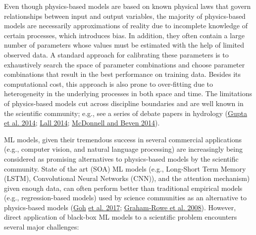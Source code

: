 \documentclass[book.tex]{subfiles}
\begin{document}
Even though physics-based models are based on known physical laws that
govern relationships between input and output variables, the majority of
physics-based models are necessarily approximations of reality due to
incomplete knowledge of certain processes, which introduces bias. In
addition, they often contain a large number of parameters whose values
must be estimated with the help of limited observed data. A standard
approach for calibrating these parameters is to exhaustively search the
space of parameter combinations and choose parameter combinations that
result in the best performance on training data. Besides its
computational cost, this approach is also prone to over-fitting due
to heterogeneity in the underlying processes in both space and time. The
limitations of physics-based models cut across discipline boundaries and
are well known in the scientific community; e.g., see a series of
debate papers in hydrology (\protect\hyperlink{page23}{Gupta et al.
2014}; \protect\hyperlink{page23}{Lall 2014};
\protect\hyperlink{page23}{McDonnell and Beven 2014}).

ML models, given their tremendous success in several commercial
applications (e.g., computer vision, and natural language processing)
are increasingly being considered as promising alternatives to
physics-based models by the scientific community. State of the art
(SOA) ML models (e.g., Long-Short Term Memory (LSTM), Convolutional
Neural Networks (CNN)), and the attention mechanism) given enough data,
can often perform better than traditional empirical models (e.g.,
regression-based models) used by science communities as an alternative
to physics-based models (\protect\hyperlink{page23}{Goh}
\protect\hyperlink{page23}{et al. 2017};
\protect\hyperlink{page23}{Graham-Rowe et al. 2008}). However, direct
application of black-box ML models to a scientific problem
encounters several major challenges: 
\end{document}
